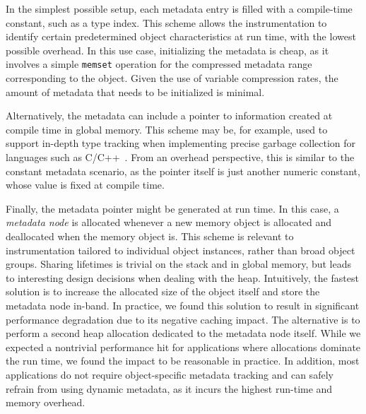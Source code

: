In the simplest possible setup, each metadata entry is filled with a compile-time constant,
such as a type index. This scheme allows the instrumentation to identify certain predetermined object characteristics at run time, with the lowest possible overhead. In this use case, initializing the
metadata is cheap, as it involves a simple \texttt{memset} operation for the compressed metadata range corresponding to the object. Given the use of variable compression rates, the amount of metadata that needs to be initialized is minimal.

Alternatively, the metadata can include a pointer to information created
at compile time in global memory. This scheme may be, for example, used to
support in-depth type tracking when implementing precise garbage collection
for languages such as C/C++~\cite{rafkind2009precise}.
From an overhead perspective, this is similar to the constant metadata scenario, as the pointer itself is just another numeric constant,
whose value is fixed at compile time.

Finally, the metadata pointer might be generated at run time.
In this case, a \emph{metadata node} is allocated whenever a new memory object
is allocated and deallocated when the memory object is. 
This scheme is relevant to instrumentation tailored to individual object
instances, rather than broad object groups. Sharing lifetimes is trivial on the
stack and in global memory, but leads to interesting design decisions when dealing
with the heap. Intuitively, the fastest solution is to increase the allocated size
of the object itself and store the metadata node in-band. In practice, we found
this solution to result in significant performance degradation due to its
negative caching impact.
The alternative is to perform a second heap allocation dedicated to the metadata node 
itself. While we expected a nontrivial performance hit for applications where allocations
dominate the run time, we found the impact to be reasonable in practice.
In addition, most applications do not require object-specific metadata tracking
and can safely refrain from using dynamic metadata, as it incurs the highest run-time and memory overhead.

